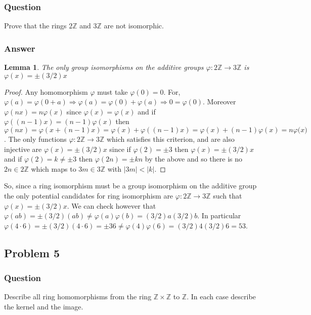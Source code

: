 \documentclass[12pt]{article}
\newtheorem{lemma}[theorem]{Lemma}
\begin{document}
\subsubsection{Question}
Prove that the rings $2 \mathbb{Z}$ and $3\mathbb{Z}$ are not isomorphic.
\subsubsection{Answer}
\begin{lemma}The only group isomorphisms on the additive groups $\varphi: 2\mathbb{Z} \to 3\mathbb{Z}$ is $\varphi{(x)}= \pm (3/2) x$  \end{lemma}

\begin{proof}
Any homomorphism $\varphi$ must take $\varphi{(0)} = 0$. For, $\varphi{(a)}=\varphi{(0+a)} \Rightarrow \varphi{(a)} = \varphi{(0)}+\varphi{(a)} \Rightarrow 0=\varphi{(0)}$. Moreover $\varphi{(n x)}=n \varphi{(x)}$ since $\varphi{(x)}=\varphi{(x)}$ and if $\varphi{((n-1)x)} = (n-1)\varphi{(x)}$ then $\varphi{(n x)} = \varphi{(x+(n-1)x)}=\varphi{(x)}+\varphi{((n-1)x)}=\varphi{(x)}+(n-1)\varphi{(x)}= n\varphi{(x})$. The only functions $\varphi : 2 \mathbb{Z} \to 3 \mathbb{Z}$ which satisfies this criterion, and are also injective are $\varphi{(x)}=\pm(3/2)x$ since if $\varphi{(2)}=\pm3$ then $\varphi{(x)}=\pm(3/2)x$ and if  $\varphi{(2)} = k \neq \pm3$ then $\varphi{(2n)} = \pm k n$ by the above and so there is no $2n \in 2 \mathbb{Z}$ which maps to $3m \in 3 \mathbb{Z}$ with $|3m| < |k|$.\end{proof}

So, since a ring isomorphism must be a group isomorphism on the additive group the only potential candidates for ring isomorphism are  $\varphi: 2\mathbb{Z} \to 3\mathbb{Z}$ such that $\varphi{(x)}= \pm (3/2) x$. We can check however that $\varphi{(a b)} = \pm(3/2) (a b) \neq \varphi{(a)}\varphi{(b)} = (3/2)a(3/2)b$. In particular $\varphi{(4\cdot 6)} = \pm (3/2) (4 \cdot 6)= \pm36 \neq \varphi{(4)}\varphi{(6)} = (3/2)4(3/2)6=53$.
\subsection{Problem 5}

\subsubsection{Question}
Describe all ring homomorphisms from the ring $\mathbb{Z} \times \mathbb{Z}$ to $\mathbb{Z}$. In each case describe the kernel and the image.
\end{document}
